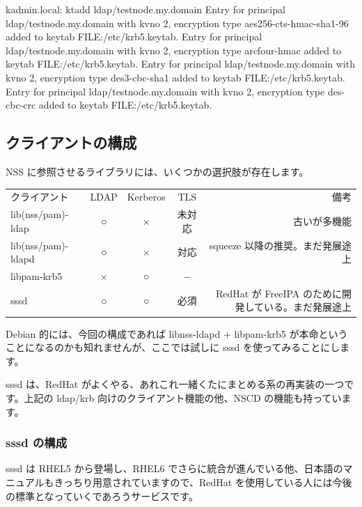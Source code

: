 \documentclass[mingoth,a4paper]{jsarticle}
\begin{document}
\begin{commandline}
kadmin.local:  ktadd ldap/testnode.my.domain
Entry for principal ldap/testnode.my.domain with kvno 2, encryption type aes256-cts-hmac-sha1-96 added to keytab FILE:/etc/krb5.keytab.
Entry for principal ldap/testnode.my.domain with kvno 2, encryption type arcfour-hmac added to keytab FILE:/etc/krb5.keytab.
Entry for principal ldap/testnode.my.domain with kvno 2, encryption type des3-cbc-sha1 added to keytab FILE:/etc/krb5.keytab.
Entry for principal ldap/testnode.my.domain with kvno 2, encryption type des-cbc-crc added to keytab FILE:/etc/krb5.keytab.
\end{commandline}

\subsection{クライアントの構成}

NSS に参照させるライブラリには、いくつかの選択肢が存在します。

\begin{table}[htb]
  \begin{tabular}{lcccr}
    クライアント & LDAP & Kerberos & TLS & 備考 \\
    lib(nss/pam)-ldap & ○ & × & 未対応 & 古いが多機能 \\
    lib(nss/pam)-ldapd & ○ & × & 対応 & squeeze 以降の推奨。まだ発展途上 \\
    libpam-krb5 & × & ○ & − & \\
    sssd & ○ & ○ & 必須 & RedHat が FreeIPA のために開発している。まだ発展途上 \\
  \end{tabular}
\end{table}

Debian 的には、今回の構成であれば libnss-ldapd + libpam-krb5 が本命ということになるのかも知れませんが、ここでは試しに sssd を使ってみることにします。

sssd は、RedHat がよくやる、あれこれ一緒くたにまとめる系の再実装の一つです。上記の ldap/krb 向けのクライアント機能の他、NSCD の機能も持っています。

\subsubsection{sssd の構成}

sssd は RHEL5 から登場し、RHEL6 でさらに統合が進んでいる他、日本語のマニュアルもきっちり用意されていますので、RedHat を使用している人には今後の標準となっていくであろうサービスです。
\end{document}
